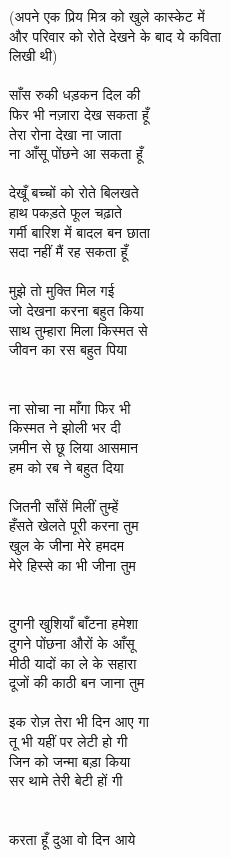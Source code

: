 {{{{{{{{{{{{{{{{{{{{{{{{{{{{{{{{{{{{{{{{{{{{{{{{{{{{{{{{{{{{{(अपने एक प्रिय मित्र को खुले कास्केट में\\
और परिवार को रोते देखने के बाद ये कविता\\
लिखी थी)\\
\\
साँस रुकी धड़कन दिल की\\
फिर भी नज़ारा देख सकता हूँ\\
तेरा रोना देखा ना जाता\\
ना आँसू पोंछने आ सकता हूँ\\
\\
देखूँ बच्चों को रोते बिलखते\\
हाथ पकड़ते फूल चढ़ाते\\
गर्मी बारिश में बादल बन छाता\\
सदा नहीं मैं रह सकता हूँ\\
\\
मुझे तो मुक्ति मिल गई\\
जो देखना करना बहुत किया\\
साथ तुम्हारा मिला किस्मत से\\
जीवन का रस बहुत पिया\\
\\
\\
ना सोचा ना माँगा फिर भी\\
किस्मत ने झोली भर दी\\
ज़मीन से छू लिया आसमान\\
हम को रब ने बहुत दिया\\
\\
जितनी साँसें मिलीं तुम्हें\\
हँसते खेलते पूरी करना तुम\\
खुल के जीना मेरे हमदम\\
मेरे हिस्से का भी जीना तुम\\
\\
\\
दुगनी खुशियाँ बाँटना हमेशा\\
दुगने पोंछना औरों के आँसू\\
मीठी यादों का ले के सहारा\\
दूजों की काठी बन जाना तुम\\
\\
इक रोज़ तेरा भी दिन आए गा\\
तू भी यहीं पर लेटी हो गी\\
जिन को जन्मा बड़ा किया\\
सर थामे तेरी बेटी हों गी\\
\\
\\
करता हूँ दुआ वो दिन आये\\
}}}}}}}}}}}}}}}}}}}}}}}}}}}}}}}}}}}}}}}}}}}}}}}}}}}}}}}}}}}}}

